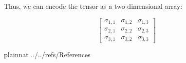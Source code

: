 \documentclass[12pt]{article}
\begin{document}
Thus, we can encode the tensor as a two-dimensional array:

$$\begin{bmatrix}
  \sigma_{1,1} & \sigma_{1,2} & \sigma_{1,3}\\
  \sigma_{2,1} & \sigma_{2,2} & \sigma_{2,3}\\
  \sigma_{3,1} & \sigma_{3,2} & \sigma_{3,3}
\end{bmatrix}
$$








\newpage

 {plainnat}
 {../../refs/References}
\end{document}
